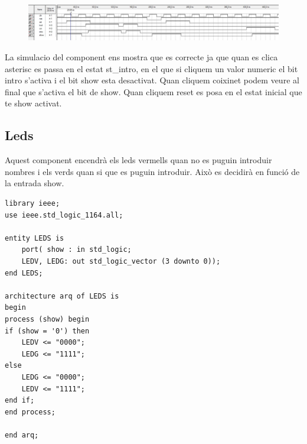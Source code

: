 \documentclass[12pt, a4papre]{article}
\begin{document}
	\begin{figure}[H]
		\begin{center}
		\includegraphics[width=130mm]{SimControl.jpeg}
		\end{center}
	\end{figure}
	
	La simulacio del component ens mostra que es correcte ja que quan es clica asterisc es passa en el estat st\_intro, en el que si cliquem un valor numeric el bit intro s'activa i el bit show esta desactivat. Quan cliquem coixinet podem veure al final que s'activa el bit de show. Quan cliquem reset es posa en el estat inicial que te show activat.
	
	
	\subsection{Leds}
	
	Aquest component encendrà els leds vermells quan no es puguin introduir nombres i els verds quan si que es puguin introduir. Això es decidirà en funció de la entrada show.
	
		\begin{lstlisting}[style=vhdl, frame=single, basicstyle=\small]
library ieee;
use ieee.std_logic_1164.all;

entity LEDS is 
	port( show : in std_logic;
	LEDV, LEDG: out std_logic_vector (3 downto 0));
end LEDS;

architecture arq of LEDS is
begin
process (show) begin
if (show = '0') then
	LEDV <= "0000";
	LEDG <= "1111";
else
	LEDG <= "0000";
	LEDV <= "1111";
end if;
end process;

end arq;

\end{lstlisting}
\end{document}
